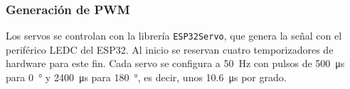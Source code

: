 \subsubsection{Generación de PWM}

Los servos se controlan con la librería \texttt{ESP32Servo}, que genera la señal con el periférico LEDC del ESP32. Al inicio se reservan cuatro temporizadores de hardware para este fin. Cada servo se configura a \SI{50}{\hertz} con pulsos de \SI{500}{\micro\second} para \SI{0}{\degree} y \SI{2400}{\micro\second} para \SI{180}{\degree}, es decir, unos \SI{10.6}{\micro\second} por grado.
